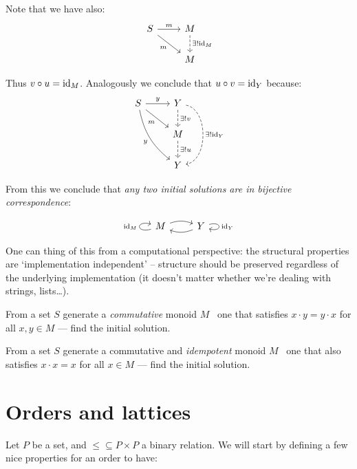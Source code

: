 Note that we have also:
$$
\begin{tikzcd}
    S \arrow[r, "m"] \arrow[rd, swap, "m"] & 
    M \arrow[d, dashed, "\exists! \id{M}"] \\
    {} & M
\end{tikzcd}
$$

Thus $v \circ u = \mathrm{id}_{ M }$. Analogously we conclude that $u \circ v = \mathrm{id}_{ Y }$
because:
$$
\begin{tikzcd}
    S \arrow[r, "y"] \arrow[rd, swap, "m"]
    \arrow[rdd, swap, bend right = 20, "y"] & 
    Y \arrow[d, dashed, "\exists! v"]
    \arrow[dd, dashed, bend left = 80, "\exists! \id{Y}"] \\
    {} & M \arrow[d, dashed, "\exists! u"] \\
    {} & Y
\end{tikzcd}
$$

From this we conclude that \textit{any two initial solutions are in bijective
correspondence}:

$$
\begin{tikzcd}
    M \arrow[r, bend left = 20] \arrow[loop left, "\id{M}"] & 
    Y \arrow[l, bend left = 20] \arrow[loop right, "\id{Y}"]
\end{tikzcd}
$$

One can thing of this from a computational perspective: the structural
properties are `implementation independent' -- structure should be preserved
regardless of the underlying implementation (it doesn't matter whether we're
dealing with strings, lists\ldots).

\begin{exercise}
From a set $S$ generate a \textit{commutative} monoid $M$ \ie~one that satisfies
$x \cdot y = y \cdot x$ for all $x, y \in M$ --- find the initial solution.
\end{exercise}

\begin{exercise}
From a set $S$ generate a commutative and \textit{idempotent} monoid $M$ \ie~one
that also satisfies $x \cdot x = x$ for all $x \in M$ --- find the initial
solution.
\end{exercise}

\section{Orders and lattices}

Let $P$ be a set, and $\leq \subseteq P \times P$ a binary relation. We will
start by defining a few nice properties for an order to have:

